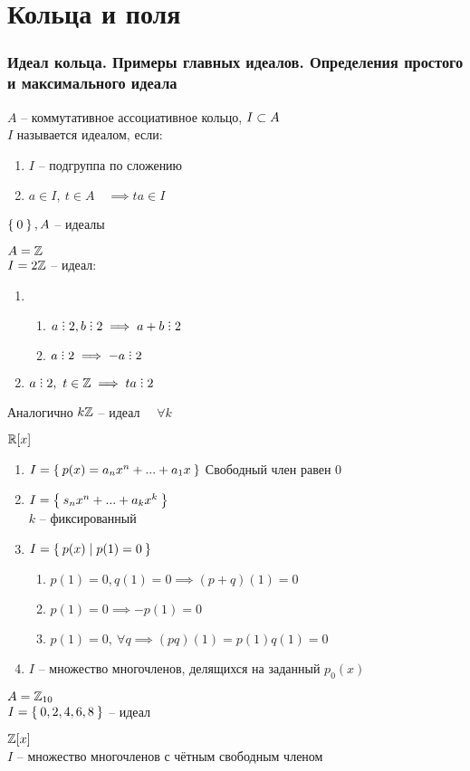 \part{Кольца и поля}

\section{Идеал кольца. Примеры главных идеалов. Определения простого и максимального идеала}

\begin{definition}
	$ A $ -- коммутативное ассоциативное кольцо, $ I \subset A $ \\
	$ I $ называется идеалом, если:
	\begin{enumerate}
		\item $ I $ -- подгруппа по сложению
		\item $ a \in I, ~ t \in A \quad \implies ta \in I $
	\end{enumerate}
\end{definition}

\begin{exmpls}
	\item $ \Set{0}, A $ -- идеалы
	\item $ A = \mathbb{Z} $ \\
	$ I = 2\mathbb{Z} $ -- идеал:
	\begin{enumerate}
		\item
		\begin{enumerate}
			\item $ a \divby 2, b \divby 2 \implies a + b \divby 2 $
			\item $ a \divby 2 \implies -a \divby 2 $
		\end{enumerate}
		\item $ a \divby 2, ~ t \in \Z \implies ta \divby 2 $
	\end{enumerate}
	Аналогично $ k\mathbb{Z} $ -- идеал $ \quad \forall k $
	\item $ \mathbb{R}[x] $
	\begin{enumerate}
		\item $ I = \Set{p(x) = a_nx^n + ... + a_1x} $
		Свободный член равен 0
		\item $ I = \Set{s_nx^n + ... + a_kx^k} $ \\
		$ k $ -- фиксированный
		\item $ I = \Set{p(x) | p(1) = 0} $
		\begin{enumerate}
			\item $ p(1) = 0, q(1) = 0 \implies (p + q)(1) = 0 $
			\item $ p(1) = 0 \implies -p(1) = 0 $
			\item $ p(1) = 0, ~ \forall q \implies (pq)(1) = p(1)q(1) = 0 $
		\end{enumerate}
		\item $ I $ -- множество многочленов, делящихся на заданный $ p_0(x) $
	\end{enumerate}
	\item $ A = \mathbb{Z}_{10} $ \\
	$ I = \Set{0, 2, 4, 6, 8} $ -- идеал
	\item $ \mathbb{Z}[x] $ \\
	$ I $ -- множество многочленов с чётным свободным членом
\end{exmpls}

